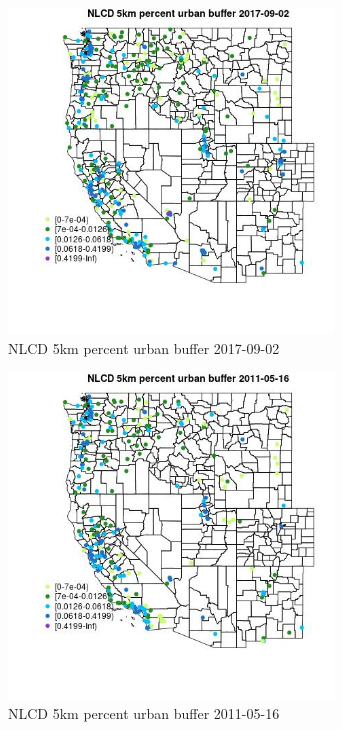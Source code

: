 \begin{figure} 
\centering  
\includegraphics[width=0.77\textwidth]{Code_Outputs/Report_ML_input_PM25_Step4_part_e_de_duplicated_aves_compiled_2019-05-20wNAs_MapObsNLCD_5km_percent_urban_buffer2017-09-02.jpg} 
\caption{\label{fig:Report_ML_input_PM25_Step4_part_e_de_duplicated_aves_compiled_2019-05-20wNAsMapObsNLCD_5km_percent_urban_buffer2017-09-02}NLCD 5km percent urban buffer 2017-09-02} 
\end{figure} 
 

\begin{figure} 
\centering  
\includegraphics[width=0.77\textwidth]{Code_Outputs/Report_ML_input_PM25_Step4_part_e_de_duplicated_aves_compiled_2019-05-20wNAs_MapObsNLCD_5km_percent_urban_buffer2011-05-16.jpg} 
\caption{\label{fig:Report_ML_input_PM25_Step4_part_e_de_duplicated_aves_compiled_2019-05-20wNAsMapObsNLCD_5km_percent_urban_buffer2011-05-16}NLCD 5km percent urban buffer 2011-05-16} 
\end{figure} 
 

